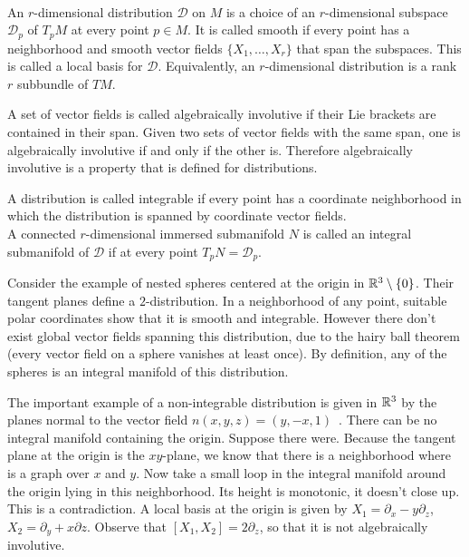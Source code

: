 \begin{definition}
\textup{\cite[2.2.1,.2.2.2,2.3.2]{Sharpe1997}} \\
An $r$-dimensional distribution $\mathcal{D}$ on $M$ is a choice of an $r$-dimensional subspace $\mathcal{D}_p$ of $T_p M$ at every point $p \in M$.
It is called smooth if every point has a neighborhood and smooth vector fields $\{X_1, \dots, X_r \}$ that span the subspaces.
This is called a local basis for $\mathcal{D}$.
Equivalently, an $r$-dimensional distribution is a rank $r$ subbundle of $TM$.

A set of vector fields is called algebraically involutive if their Lie brackets are contained in their span.
Given two sets of vector fields with the same span, one is algebraically involutive if and only if the other is.
Therefore algebraically involutive is a property that is defined for distributions.

A distribution is called integrable if every point has a coordinate neighborhood in which the distribution is spanned by coordinate vector fields.
\\
A connected $r$-dimensional immersed submanifold $N$ is called an integral submanifold of $\mathcal{D}$ if at every point $T_pN = \mathcal{D}_p$.
\end{definition}

Consider the example of nested spheres centered at the origin in $\mathbb{R}^3\setminus\{0\}$. 
Their tangent planes define a $2$-distribution.
In a neighborhood of any point, suitable polar coordinates show that it is smooth and integrable.
However there don't exist global vector fields spanning this distribution, due to the hairy ball theorem (every vector field on a sphere vanishes at least once).
By definition, any of the spheres is an integral manifold of this distribution.

The important example of a non-integrable distribution is given in $\mathbb{R}^3$ by the planes normal to the vector field $n(x,y,z)=(y,-x,1)$~\cite[Ex~2.3.1]{Sharpe1997}.
There can be no integral manifold containing the origin.
Suppose there were.
Because the tangent plane at the origin is the $xy$-plane, we know that there is a neighborhood where is a graph over $x$ and $y$.
Now take a small loop in the integral manifold around the origin lying in this neighborhood.
Its height is monotonic, it doesn't close up.
This is a contradiction.
A local basis at the origin is given by $X_1 = \partial_x - y \partial_z$, $X_2 = \partial_y + x\partial z$.
Observe that $[X_1,X_2] = 2\partial_z$, so that it is not algebraically involutive.


